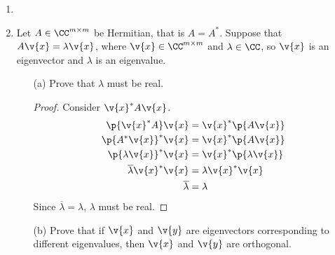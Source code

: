 \documentclass[11pt]{article}
\begin{document}
\begin{enumerate}
\begin{enumerate}
        \end{enumerate}

    \item %

    \item %
        Let $A \in \CC^{m \times m}$ be Hermitian, that is $A = A^*$.
        Suppose that $A\v{x} = \lambda\v{x}$, where $\v{x} \in \CC^{m \times m}$
        and $\lambda \in \CC$, so $\v{x}$ is an eigenvector and $\lambda$ is an
        eigenvalue.
        \begin{enumerate}
            \item[(a)]
                Prove that $\lambda$ must be real.

                \begin{proof}
                    Consider $\v{x}^* A \v{x}$.
                    \begin{align*}
                        \p{\v{x}^* A} \v{x} &= \v{x}^* \p{A \v{x}} \\
                        \p{A^* \v{x}}^* \v{x} &= \v{x}^* \p{A \v{x}} \\
                        \p{\lambda \v{x}}^* \v{x} &= \v{x}^* \p{\lambda \v{x}} \\
                        \overline{\lambda} \v{x}^* \v{x} &= \lambda \v{x}^*\v{x}  \\
                        \overline{\lambda} &= \lambda
                    \end{align*}
                    Since $\overline{\lambda} = \lambda$, $\lambda$ must be real. 
                \end{proof}

            \item[(b)]
                Prove that if $\v{x}$ and $\v{y}$ are eigenvectors
                corresponding to different eigenvalues, then $\v{x}$ and
                $\v{y}$ are orthogonal.


\end{enumerate}
\end{enumerate}
\end{document}
